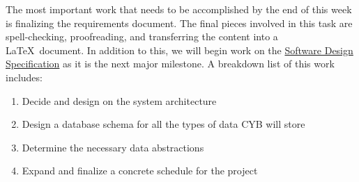 \documentclass[12pt]{article}
\begin{document}
The most important work that needs to be accomplished by the end of this week is finalizing the requirements document. The final pieces involved in this task are spell-checking, proofreading, and transferring the content into a \LaTeX\ document. In addition to this, we will begin work on the \href{http://courses.cs.washington.edu/courses/cse403/16wi/assignments/project3.html}{Software Design Specification} as it is the next major milestone. A breakdown list of this work includes:

\begin{enumerate}
    \item Decide and design on the system architecture
    \item Design a database schema for all the types of data CYB will store
    \item Determine the necessary data abstractions
    \item Expand and finalize a concrete schedule for the project
\end{enumerate}
\end{document}
